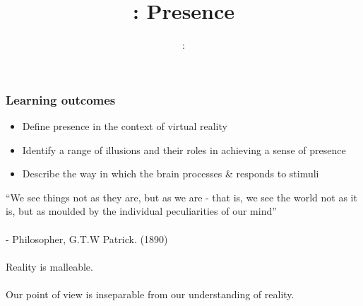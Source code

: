 \usepackage{../../beamerthemeFalmouthGamesAcademy}
\usepackage{multimedia}
\graphicspath{ {../../} }


\usepackage[normalem]{ulem}
\usepackage{wasysym}

\usepackage{pdfpages}

\usetikzlibrary{arrows,automata}




\title{\sessionnumber: Presence}
\subtitle{\modulecode: \moduletitle}

\frame{\titlepage} 

\begin{frame}
	\frametitle{Learning outcomes}
	\begin{itemize}
		\item Define presence in the context of virtual reality
		\item Identify a range of illusions and their roles in achieving a sense of presence
		\item Describe the way in which the brain processes \& responds to stimuli
	\end{itemize}
\end{frame}

\begin{frame}
	``We see things not as they are, but as we are - that is, we see the world not as it is, but as moulded by the individual peculiarities of our mind'' \\~\\ - Philosopher, G.T.W Patrick. (1890) \\~\\
	\pause
	Reality is malleable. \\~\\ 
	\pause
	Our point of view is inseparable from our understanding of reality. 	
	
\end{frame}

